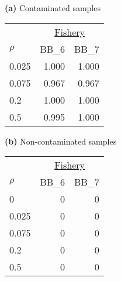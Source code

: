 {\bf (a)} Contaminated samples 
\begin{center}
\begin{tabular}{lrr} 
  &  \multicolumn{2}{c}{\underline{Fishery}} \\
$\rho~~~~~~~$  &  BB_6            &  BB_7            \\  
\hline 0.025   &  1.000           &  1.000           \\  
0.075           &  0.967           &  0.967           \\  
0.2             &  1.000           &  1.000           \\  
0.5             &  0.995           &  1.000           \\  
\end{tabular} 
\end{center}
{\bf (b)} Non-contaminated samples 
\begin{center}
\begin{tabular}{lrr} 
  &  \multicolumn{2}{c}{\underline{Fishery}} \\
$\rho~~~~~~~$  &  BB_6            &  BB_7            \\  
\hline 0       &  0               &  0               \\  
0.025           &  0               &  0               \\  
0.075           &  0               &  0               \\  
0.2             &  0               &  0               \\  
0.5             &  0               &  0               \\  
\end{tabular} 
\end{center}
